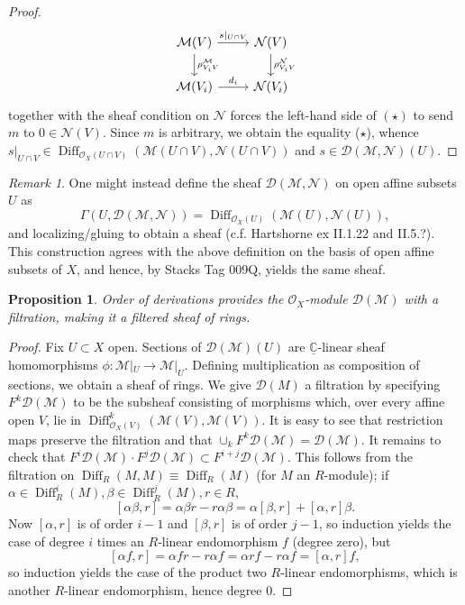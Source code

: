 \documentclass{article}
\newcommand{\C}{\mathbb{C}}
\theoremstyle{plain}
\newtheorem{proposition}[theorem]{Proposition}
\theoremstyle{definition}
\theoremstyle{remark}
\newtheorem*{remark}{Remark}
\DeclareMathOperator{\Diff}{Diff}
\begin{document}
\begin{proof}
\begin{equation*}
\begin{tikzcd}
            \mathcal{M}(V)\ar{r}{s|_{U\cap V}}\ar{d}{\rho^\mathcal{M}_{V_iV}} & \mathcal{N}(V)\ar{d}{\rho^\mathcal{N}_{V_iV}}\\
            \mathcal{M}(V_i)\ar{r}{d_i} & \mathcal{N}(V_i)
        \end{tikzcd}
    \end{equation*}
    together with the sheaf condition on $\mathcal{N}$ forces the left-hand side of $(\star)$
    to send $m$ to $0\in\mathcal{N}(V).$ Since $m$ is arbitrary, we obtain the equality ($\star$),
    whence $s|_{U\cap V}\in\Diff_{\mathcal{O}_X(U\cap V)}(\mathcal{M}(U\cap V),\mathcal{N}(U\cap V))$
    and $s\in\mathcal{D}(\mathcal{M},\mathcal{N})(U)$.
\end{proof}

\begin{remark}
    One might instead define the sheaf $\mathcal{D}(\mathcal{M},\mathcal{N})$ on open affine subsets $U$ as
    \[\Gamma(U,\mathcal{D}(\mathcal{M},\mathcal{N}))=\Diff_{\mathcal{O}_X(U)}(\mathcal{M}(U),\mathcal{N}(U)),\]
    and localizing/gluing to obtain a sheaf (c.f. Hartshorne ex II.1.22 and II.5.?).
    This construction agrees with the above definition on the
    basis of open affine subsets of $X$, and hence, by Stacks Tag 009Q, yields the same sheaf.
\end{remark}

\begin{proposition}
    Order of derivations provides the $\mathcal{O}_X$-module $\mathcal{D}(\mathcal{M})$ with
    a filtration, making it a filtered sheaf of rings.
\end{proposition}
\begin{proof}
    Fix $U\subset X$ open. Sections of $\mathcal{D}(\mathcal{M})(U)$ are $\underline{\C}$-linear
    sheaf homomorphisms $\phi:\mathcal{M}|_U\to\mathcal{M}|_U$. Defining multiplication as composition
    of sections, we obtain a sheaf of rings. We give $\mathcal{D}(M)$ a filtration by specifying
    $F^k\mathcal{D}(\mathcal{M})$ to be the subsheaf consisting of morphisms which, over every affine
    open $V$, lie in $\Diff^k_{\mathcal{O}_X(V)}(\mathcal{M}(V),\mathcal{M}(V))$. It is easy to see
    that restriction maps preserve the filtration and that $\cup_kF^k\mathcal{D}(\mathcal{M})=\mathcal{D}(\mathcal{M})$.
    It remains to check that
    $F^i\mathcal{D}(\mathcal{M})\cdot F^j\mathcal{D}(\mathcal{M})\subset F^{i+j}\mathcal{D}(\mathcal{M})$.
    This follows from the filtration on $\Diff_R(M,M)\equiv\Diff_R(M)$ (for $M$ an $R$-module);
    if $\alpha\in\Diff^i_R(M),\beta\in\Diff^j_R(M),r\in R$,
    \[ [\alpha\beta,r] = \alpha\beta r-r\alpha\beta = \alpha[\beta,r] +[\alpha,r]\beta.  \]
    Now $[\alpha,r]$ is of order $i-1$ and $[\beta,r]$ is of order $j-1$, so induction
    yields the case of degree $i$ times an $R$-linear endomorphism $f$ (degree zero), but
    \[ [\alpha f, r]=\alpha fr-r\alpha f=\alpha rf-r\alpha f=[\alpha,r]f, \]
    so induction yields the case of the product two $R$-linear endomorphisms, which is another
    $R$-linear endomorphism, hence degree 0.
\end{proof}
\end{document}

